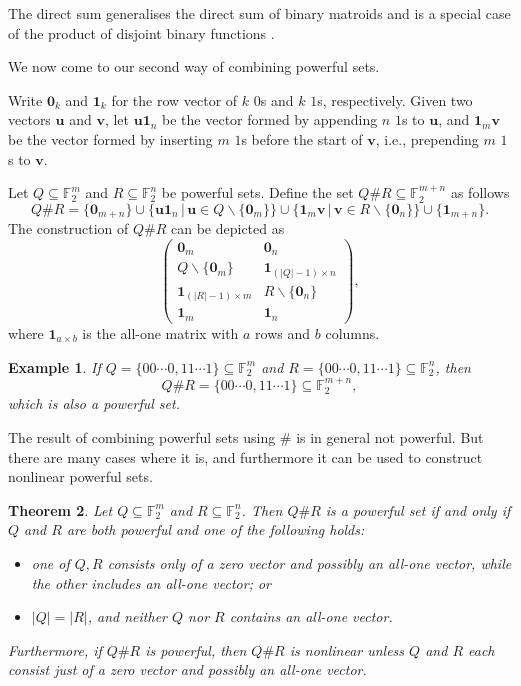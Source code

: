 \documentclass[12pt]{article}
\newtheorem{thm}{Theorem}[section]
\newtheorem{exa}[thm]{Example}
\begin{document}
The direct sum generalises the direct sum of binary matroids and is a special
case of the product of disjoint binary functions \cite[p.\ 276]{farr93}.

We now come to our second way of combining powerful sets.

Write $\mathbf{0}_k$ and $\mathbf{1}_k$ for the row vector of $k$ $0$s and $k$ $1$s, respectively. Given two vectors $\mathbf{u}$ and $\mathbf{v}$, let $\mathbf{u}\mathbf{1}_n$ be the vector formed by appending $n$ $1$s to $\mathbf{u}$, and $\mathbf{1}_m\mathbf{v}$ be the vector formed by inserting $m$ $1$s before the start of $\mathbf{v}$, i.e., prepending $m$ $1$s to $\mathbf{v}$.

Let $Q\subseteq\mathbb{F}_2^{m}$ and $R\subseteq\mathbb{F}_2^{n}$ be powerful sets. Define the set $Q\#R\subseteq \mathbb{F}_2^{m+n}$ as follows
\[Q\#R=\{\mathbf{0}_{m+n}\}\cup\{\mathbf{u}\mathbf{1}_n\,|\,\mathbf{u}\in Q\backslash\{\mathbf{0}_m\}\}\cup\{\mathbf{1}_m\mathbf{v}\,|\, \mathbf{v}\in R\backslash\{\mathbf{0}_n\}\}\cup\{\mathbf{1}_{m+n}\}.\]
The construction of $Q\#R$ can be depicted as
\begin{equation*}
\left(
\begin{array}{c|c}
\mathbf{0}_m                  &\mathbf{0}_n \\[5pt]
Q\backslash\{\mathbf{0}_m\}   &\mathbf{1}_{(|Q|-1)\times n}\\[5pt]
\mathbf{1}_{(|R|-1)\times m}                  &R\backslash\{\mathbf{0}_n\} \\[5pt]
\mathbf{1}_m                  &\mathbf{1}_n
\end{array}
\right),
\end{equation*}
where $\mathbf{1}_{a\times b}$ is the all-one matrix with $a$ rows and $b$ columns.
\begin{exa}
If $Q=\{00\cdots0,11\cdots1\}\subseteq\mathbb{F}_2^m$ and $R=\{00\cdots0,11\cdots1\}\subseteq\mathbb{F}_2^n$, then
\[Q\#R=\{00\cdots0,11\cdots1\}\subseteq\mathbb{F}_2^{m+n},\]
which is also a powerful set.
\end{exa}

The result of combining powerful sets using \# is in general not powerful.
But there are many cases where it is,
and furthermore it can be used to construct nonlinear powerful sets.

\begin{thm}
Let $Q\subseteq\mathbb{F}_2^{m}$ and $R\subseteq\mathbb{F}_2^{n}$.
Then
$Q\#R$ is a powerful set if and only if $Q$ and $R$ are both powerful
and one of the following holds:
\begin{itemize}
\item[(a)]  one of $Q,R$ consists only of a zero vector and possibly an all-one vector, while the other includes an all-one vector; or
\item[(b)]  $|Q|=|R|$, and neither $Q$ nor $R$ contains an all-one vector.
\end{itemize}

Furthermore, if $Q\#R$ is powerful, then $Q\#R$ is nonlinear unless $Q$ and $R$ each consist just of a zero vector and possibly an all-one vector.
\end{thm}
\end{document}

